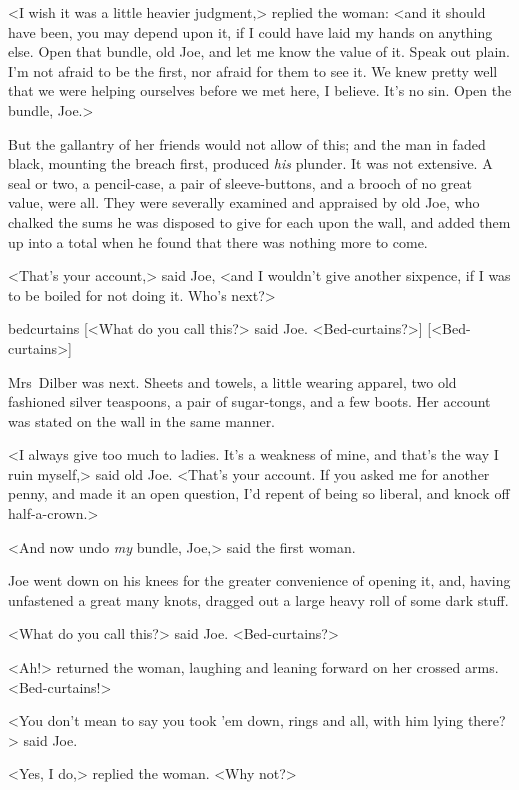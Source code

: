 <I wish it was a little heavier judgment,> replied the woman: <and it should have been, you may depend upon it, if I could have laid my hands on anything else. Open that bundle, old Joe, and let me know the value of it. Speak out plain. I'm not afraid to be the first, nor afraid for them to see it. We knew pretty well that we were helping ourselves before we met here, I believe. It's no sin. Open the bundle, Joe.>

But the gallantry of her friends would not allow of this; and the man in faded black, mounting the breach first, produced \textit{his} plunder. It was not extensive. A seal or two, a pencil-case, a pair of sleeve-buttons, and a brooch of no great value, were all. They were severally examined and appraised by old Joe, who chalked the sums he was disposed to give for each upon the wall, and added them up into a total when he found that there was nothing more to come.

<That's your account,> said Joe, <and I wouldn't give another sixpence, if I was to be boiled for not doing it. Who's next?>

\begin{colorbigpic}
	[\basicscale]
	{bedcurtains}
	[<What do you call this?> said Joe. <Bed-curtains?>]
	[<Bed-curtains>]
\end{colorbigpic}

Mrs~Dilber was next. Sheets and towels, a little wearing apparel, two old fashioned silver teaspoons, a pair of sugar-tongs, and a few boots. Her account was stated on the wall in the same manner.

<I always give too much to ladies. It's a weakness of mine, and that's the way I ruin myself,> said old Joe. <That's your account. If you asked me for another penny, and made it an open question, I'd repent of being so liberal, and knock off half-a-crown.>

<And now undo \textit{my} bundle, Joe,> said the first woman.

Joe went down on his knees for the greater convenience of opening it, and, having unfastened a great many knots, dragged out a large heavy roll of some dark stuff.

<What do you call this?> said Joe. <Bed-curtains?>

<Ah!> returned the woman, laughing and leaning forward on her crossed arms. <Bed-curtains!>

<You don't mean to say you took 'em down, rings and all, with him lying there?> said Joe.

<Yes, I do,> replied the woman. <Why not?>

